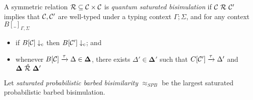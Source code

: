 


\begin{definition}
	A symmetric relation $\mathcal{R} \subseteq \mathcal{C} \times \mathcal{C}$ is \emph{quantum saturated bisimulation} if $\mathcal{C}\ \mathcal{R}\ \mathcal{C}'$ implies that $\mathcal{C}, \mathcal{C}'$ are well-typed under a typing context $\Gamma; \Sigma$, and for any context $B[\_]_{\Gamma, \Sigma}$
	\begin{itemize}
		\item if $B[\mathcal{C}] \downarrow_{c}$ then $B[\mathcal{C}'] \downarrow_{c}$; and 
		\item whenever $B[\mathcal{C}] \xrightarrow{\tau} \Delta \in \mathbf{\Delta}$, there exists $\Delta' \in \mathbf{\Delta'}$ such that $C[\mathcal{C}'] \xrightarrow{\tau} \Delta'$ and $\mathbf{\Delta}\ \sqlift{\rel}\ \mathbf{\Delta'}$
	\end{itemize}
	Let \emph{saturated probabilistic barbed bisimilarity} $\approx_{SPB}$ be the largest saturated probabilistic barbed bisimulation.
\end{definition}





